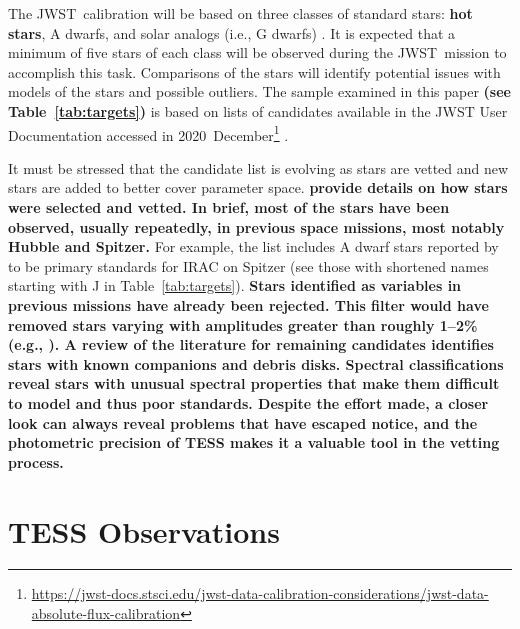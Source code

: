 \documentclass[twocolumn, linenumbers]{aastex631}
\newcommand{\webb}{JWST}
\newcommand{\jwst}{JWST}
\begin{document}
The \webb\ calibration will be based on three classes of standard stars:  \textbf{hot stars}, A dwarfs, and solar analogs (i.e., G dwarfs) \citep{Gordon2022inprep}.  It is expected that a minimum of five stars of each class will be observed during the \jwst\ mission to accomplish this task.  Comparisons of the stars will identify potential issues with models of the stars and possible outliers.  The sample examined in this paper \textbf{(see Table~\ref{tab:targets})} is based on lists of candidates available in the JWST User Documentation accessed in 2020~December\footnote{\url{https://jwst-docs.stsci.edu/jwst-data-calibration-considerations/jwst-data-absolute-flux-calibration}} \citep{jdox}.

It must be stressed that the candidate list is evolving as stars are vetted and new stars are added to better cover parameter space.  \textbf{\cite{Gordon2022inprep} provide details on how stars were selected and vetted.  In brief, most of the stars have been observed, usually repeatedly, in previous space missions, most notably Hubble and Spitzer.}  For example, the list includes A dwarf stars reported by \citet{Reach2005} to be primary standards for IRAC on Spitzer (see those with shortened names starting with J in Table~\ref{tab:targets}). \textbf{Stars identified as variables in previous missions have already been rejected.  This filter would have removed stars varying with amplitudes greater than roughly 1--2\% (e.g., \citealt{Sloan2015}).  A review of the literature for remaining candidates identifies stars with known companions and debris disks.  Spectral classifications reveal stars with unusual spectral properties that make them difficult to model and thus poor standards.  Despite the effort made, a closer look can always reveal problems that have escaped notice, and the photometric precision of TESS makes it a valuable tool in the vetting process.}



\section{TESS Observations} %
\label{sec:obs}
\end{document}
